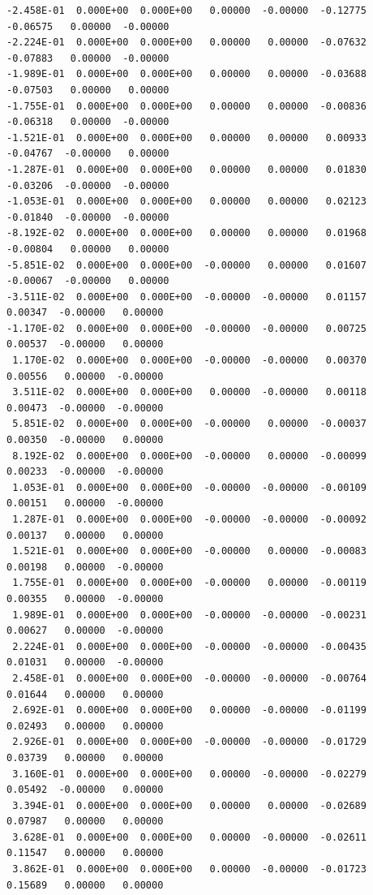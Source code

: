 {\begin{verbatim}
-2.458E-01  0.000E+00  0.000E+00   0.00000  -0.00000  -0.12775  -0.06575   0.00000  -0.00000
-2.224E-01  0.000E+00  0.000E+00   0.00000   0.00000  -0.07632  -0.07883   0.00000  -0.00000
-1.989E-01  0.000E+00  0.000E+00   0.00000   0.00000  -0.03688  -0.07503   0.00000   0.00000
-1.755E-01  0.000E+00  0.000E+00   0.00000   0.00000  -0.00836  -0.06318   0.00000  -0.00000
-1.521E-01  0.000E+00  0.000E+00   0.00000   0.00000   0.00933  -0.04767  -0.00000   0.00000
-1.287E-01  0.000E+00  0.000E+00   0.00000   0.00000   0.01830  -0.03206  -0.00000  -0.00000
-1.053E-01  0.000E+00  0.000E+00   0.00000   0.00000   0.02123  -0.01840  -0.00000  -0.00000
-8.192E-02  0.000E+00  0.000E+00   0.00000   0.00000   0.01968  -0.00804   0.00000   0.00000
-5.851E-02  0.000E+00  0.000E+00  -0.00000   0.00000   0.01607  -0.00067  -0.00000   0.00000
-3.511E-02  0.000E+00  0.000E+00  -0.00000  -0.00000   0.01157   0.00347  -0.00000   0.00000
-1.170E-02  0.000E+00  0.000E+00  -0.00000  -0.00000   0.00725   0.00537  -0.00000   0.00000
 1.170E-02  0.000E+00  0.000E+00  -0.00000  -0.00000   0.00370   0.00556   0.00000  -0.00000
 3.511E-02  0.000E+00  0.000E+00   0.00000  -0.00000   0.00118   0.00473  -0.00000  -0.00000
 5.851E-02  0.000E+00  0.000E+00  -0.00000   0.00000  -0.00037   0.00350  -0.00000   0.00000
 8.192E-02  0.000E+00  0.000E+00  -0.00000   0.00000  -0.00099   0.00233  -0.00000  -0.00000
 1.053E-01  0.000E+00  0.000E+00  -0.00000  -0.00000  -0.00109   0.00151   0.00000  -0.00000
 1.287E-01  0.000E+00  0.000E+00  -0.00000  -0.00000  -0.00092   0.00137   0.00000   0.00000
 1.521E-01  0.000E+00  0.000E+00  -0.00000   0.00000  -0.00083   0.00198   0.00000  -0.00000
 1.755E-01  0.000E+00  0.000E+00  -0.00000   0.00000  -0.00119   0.00355   0.00000  -0.00000
 1.989E-01  0.000E+00  0.000E+00  -0.00000  -0.00000  -0.00231   0.00627   0.00000  -0.00000
 2.224E-01  0.000E+00  0.000E+00  -0.00000  -0.00000  -0.00435   0.01031   0.00000  -0.00000
 2.458E-01  0.000E+00  0.000E+00  -0.00000  -0.00000  -0.00764   0.01644   0.00000   0.00000
 2.692E-01  0.000E+00  0.000E+00   0.00000  -0.00000  -0.01199   0.02493   0.00000   0.00000
 2.926E-01  0.000E+00  0.000E+00  -0.00000  -0.00000  -0.01729   0.03739   0.00000   0.00000
 3.160E-01  0.000E+00  0.000E+00   0.00000  -0.00000  -0.02279   0.05492  -0.00000   0.00000
 3.394E-01  0.000E+00  0.000E+00   0.00000   0.00000  -0.02689   0.07987   0.00000   0.00000
 3.628E-01  0.000E+00  0.000E+00   0.00000  -0.00000  -0.02611   0.11547   0.00000   0.00000
 3.862E-01  0.000E+00  0.000E+00   0.00000  -0.00000  -0.01723   0.15689   0.00000   0.00000

\end{verbatim}}
